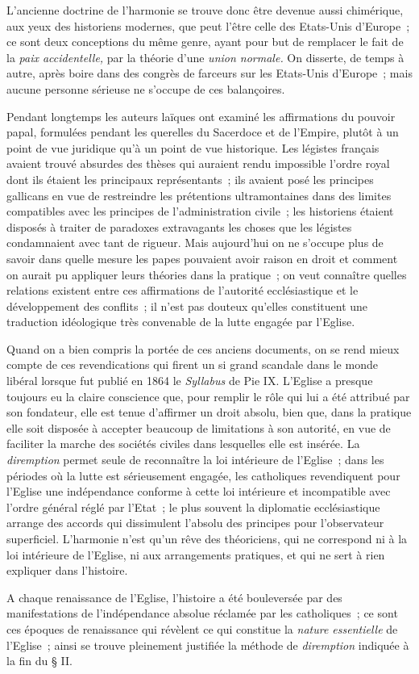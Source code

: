 \documentclass[french,twoside]{book} %
\begin{document}
\noindent L’ancienne doctrine de l’harmonie se trouve donc être devenue aussi chimérique, aux yeux des historiens modernes, que peut l’être celle des Etats-Unis d’Europe ; ce sont deux conceptions du même genre, ayant pour but de remplacer le fait de la \emph{paix accidentelle,} par la théorie d’une \emph{union normale.} On disserte, de temps à autre, après boire dans des congrès de farceurs sur les Etats-Unis d’Europe ; mais aucune personne sérieuse ne s’occupe de ces balançoires.\par
Pendant longtemps les auteurs laïques ont examiné les affirmations du pouvoir papal, formulées pendant les querelles du Sacerdoce et de l’Empire, plutôt à un point de vue juridique qu’à un point de vue historique. Les légistes français avaient trouvé absurdes des thèses qui auraient rendu impossible l’ordre royal dont ils étaient les principaux représentants ; ils avaient posé les principes gallicans en vue de restreindre les prétentions ultramontaines dans des limites compatibles avec les principes de l’administration civile ; les historiens étaient disposés à traiter de paradoxes extravagants les choses que les légistes condamnaient avec tant de rigueur. Mais aujourd’hui on ne s’occupe plus de savoir dans quelle mesure les papes pouvaient avoir raison en droit et comment on aurait pu appliquer leurs théories dans la pratique ; on veut connaître quelles relations existent entre ces affirmations de l’autorité ecclésiastique et le  développement des conflits ; il n’est pas douteux qu’elles constituent une traduction idéologique très convenable de la lutte engagée par l’Eglise.\par
Quand on a bien compris la portée de ces anciens documents, on se rend mieux compte de ces revendications qui firent un si grand scandale dans le monde libéral lorsque fut publié en 1864 le \emph{Syllabus} de Pie IX. L’Eglise a presque toujours eu la claire conscience que, pour remplir le rôle qui lui a été attribué par son fondateur, elle est tenue d’affirmer un droit absolu, bien que, dans la pratique elle soit disposée à accepter beaucoup de limitations à son autorité, en vue de faciliter la marche des sociétés civiles dans lesquelles elle est insérée. La \emph{diremption} permet seule de reconnaître la loi intérieure de l’Eglise ; dans les périodes où la lutte est sérieusement engagée, les catholiques revendiquent pour l’Eglise une indépendance conforme à cette loi intérieure et incompatible avec l’ordre général réglé par l’Etat ; le plus souvent la diplomatie ecclésiastique arrange des accords qui dissimulent l’absolu des principes pour l’observateur superficiel. L’harmonie n’est qu’un rêve des théoriciens, qui ne correspond ni à la loi intérieure de l’Eglise, ni aux arrangements pratiques, et qui ne sert à rien expliquer dans l’histoire.\par
A chaque renaissance de l’Eglise, l’histoire a été bouleversée par des manifestations de l’indépendance absolue réclamée par les catholiques ; ce sont ces époques de renaissance qui révèlent ce qui constitue la \emph{nature essentielle} de l’Eglise ; ainsi se trouve pleinement justifiée la méthode de \emph{diremption} indiquée à la fin du § II.
\end{document}
